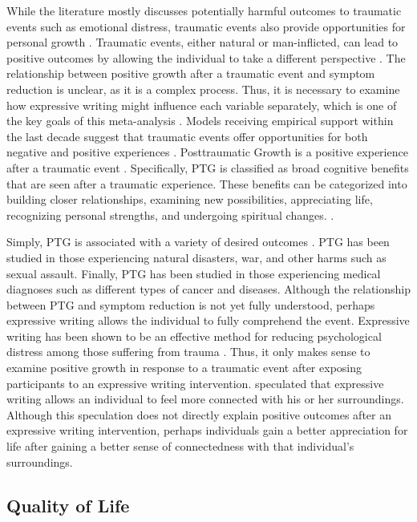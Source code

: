 \documentclass[english,man]{apa6}
\theoremstyle{definition}
\theoremstyle{definition}
\theoremstyle{definition}
\theoremstyle{remark}
\begin{document}
While the literature mostly discusses potentially harmful outcomes to
traumatic events such as emotional distress, traumatic events also
provide opportunities for personal growth \autocite{Aslam2013}.
Traumatic events, either natural or man-inflicted, can lead to positive
outcomes by allowing the individual to take a different perspective
\autocites{Cobb2006}{Taku2008}. The relationship between positive growth
after a traumatic event and symptom reduction is unclear, as it is a
complex process. Thus, it is necessary to examine how expressive writing
might influence each variable separately, which is one of the key goals
of this meta-analysis \autocite{Slavin-Spenny2011}. Models receiving
empirical support within the last decade suggest that traumatic events
offer opportunities for both negative and positive experiences
\autocites{Tedeschi1995}{Weiss2002}. Posttraumatic Growth is a positive
experience after a traumatic event \autocites{Aslam2013}{Yilmaz2016}.
Specifically, PTG is classified as broad cognitive benefits that are
seen after a traumatic experience. These benefits can be categorized
into building closer relationships, examining new possibilities,
appreciating life, recognizing personal strengths, and undergoing
spiritual changes. \autocites{Dursun2016}{Tedeschi2004}.

Simply, PTG is associated with a variety of desired outcomes
\autocite{Dursun2016}. PTG has been studied in those experiencing
natural disasters, war, and other harms such as sexual assault. Finally,
PTG has been studied in those experiencing medical diagnoses such as
different types of cancer and diseases. Although the relationship
between PTG and symptom reduction is not yet fully understood, perhaps
expressive writing allows the individual to fully comprehend the event.
Expressive writing has been shown to be an effective method for reducing
psychological distress among those suffering from trauma
\autocite{Sloan2007}. Thus, it only makes sense to examine positive
growth in response to a traumatic event after exposing participants to
an expressive writing intervention. \textcite{Pennebaker2001} speculated
that expressive writing allows an individual to feel more connected with
his or her surroundings. Although this speculation does not directly
explain positive outcomes after an expressive writing intervention,
perhaps individuals gain a better appreciation for life after gaining a
better sense of connectedness with that individual's surroundings.

\subsection{Quality of Life}\label{quality-of-life}
\end{document}

